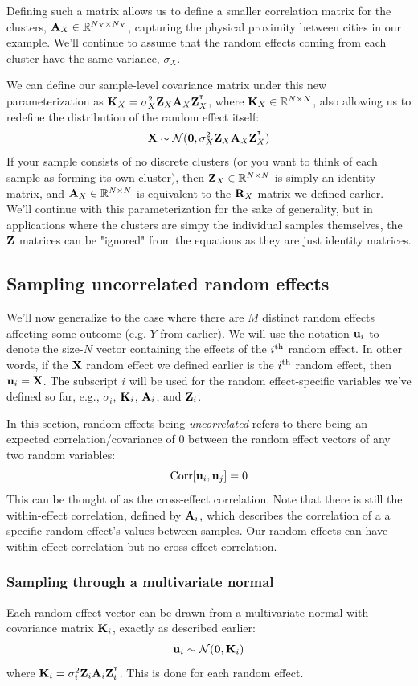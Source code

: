 \documentclass[12pt]{article}
\begin{document}
Defining such a matrix allows us to define a smaller correlation matrix for the clusters, $\mathbf{A}_X \in \mathbb{R}^{N_X \times N_X}$, capturing the physical proximity between cities in our example.
We'll continue to assume that the random effects coming from each cluster have the same variance, $\sigma_X$.

We can define our sample-level covariance matrix under this new parameterization as $\mathbf{K}_X = \sigma_X^2 \mathbf{Z}_X \mathbf{A}_X \mathbf{Z}_X^{^\intercal}$, where $\mathbf{K}_X \in \mathbb{R}^{N \times N}$, also allowing us to redefine the distribution of the random effect itself:
$$ \mathbf{X} \sim \mathcal{N} (\textbf{0}, \sigma_X^2 \mathbf{Z}_X \mathbf{A}_X \mathbf{Z}_X^{^\intercal} ) $$
If your sample consists of no discrete clusters (or you want to think of each sample as forming its own cluster), then $\mathbf{Z}_X \in \mathbb{R}^{N \times N}$ is simply an identity matrix, and $\mathbf{A}_X \in \mathbb{R}^{N \times N}$ is equivalent to the $\mathbf{R}_X$ matrix we defined earlier.
We'll continue with this parameterization for the sake of generality, but in applications where the clusters are simpy the individual samples themselves, the $\mathbf{Z}$ matrices can be "ignored" from the equations as they are just identity matrices.

\subsection{Sampling uncorrelated random effects}
We'll now generalize to the case where there are $M$ distinct random effects affecting some outcome (e.g. $Y$ from earlier).
We will use the notation $\mathbf{u}_i$ to denote the size-$N$ vector containing the effects of the $i\textsuperscript{th}$ random effect.
In other words, if the $\mathbf{X}$ random effect we defined earlier is the $i\textsuperscript{th}$ random effect, then $\mathbf{u}_i = \mathbf{X}$. 
The subscript $i$ will be used for the random effect-specific variables we've defined so far, e.g., $\sigma_i$, $\mathbf{K}_i$, $\mathbf{A}_i$, and $\mathbf{Z}_i$.


In this section, random effects being \emph{uncorrelated} refers to there being an expected correlation/covariance of 0 between the random effect vectors of any two random variables:
$$ \mathrm{Corr}[\mathbf{u}_i, \mathbf{u}_j] = 0 $$
This can be thought of as the cross-effect correlation.
Note that there is still the within-effect correlation, defined by $\mathbf{A}_i$, which describes the correlation of a a specific random effect's values between samples.
Our random effects can have within-effect correlation but no cross-effect correlation.

\subsubsection{Sampling through a multivariate normal}
Each random effect vector can be drawn from a multivariate normal with covariance matrix $\mathbf{K}_i$, exactly as described earlier:
$$ \mathbf{u}_i \sim \mathcal{N} (\textbf{0}, \mathbf{K}_i) $$
where $\mathbf{K}_i = \sigma_i^2 \mathbf{Z}_i \mathbf{A}_i \mathbf{Z}_i^{^\intercal} $.
This is done for each random effect.
\end{document}
